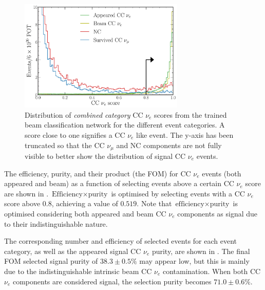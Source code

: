\begin{figure} %
    \includegraphics[width=0.7\textwidth]{diagrams/7-results/final_beam_nuel_outputs.pdf}
    \caption[Distribution of CC $\nu_{e}$ scores from the trained beam classification network]
    {Distribution of \emph{combined category} CC $\nu_{e}$ scores from the trained beam
        classification network for the different event categories. A score close to one signifies
        a CC $\nu_{e}$ like event. The y-axis has been truncated so that the CC $\nu_{\mu}$ and NC
        components are not fully visible to better show the distribution of signal CC $\nu_{e}$
        events.}
    \label{fig:final_beam_nuel_outputs}
\end{figure}

The efficiency, purity, and their product (the FOM) for CC $\nu_{e}$ events (both appeared and
beam) as a function of selecting events above a certain CC $\nu_{e}$ score are shown in
. $\text{Efficiency}\times\text{purity}$ is optimised by
selecting events with a CC $\nu_{e}$ score above $0.8$, achieving a value of $0.519$. Note that
$\text{efficiency}\times\text{purity}$ is optimised considering both appeared and beam CC
$\nu_{e}$ components as signal due to their indistinguishable nature.

The corresponding number and efficiency of selected events for each event category, as well as the
appeared signal CC $\nu_{e}$ purity, are shown in . The final FOM
selected signal purity of $38.3\pm0.5\%$ may appear low, but this is mainly due to the
indistinguishable intrinsic beam CC $\nu_{e}$ contamination. When both CC $\nu_{e}$ components are
considered signal, the selection purity becomes $71.0\pm0.6\%$.

